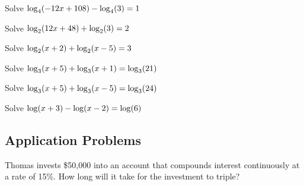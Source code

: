 \begin{exercise}
Solve $\displaystyle\log_4(-12x+108)-\log_4(3)=1$

\end{exercise}
\begin{solution}[4in]

\end{solution}

\begin{exercise}
Solve $\displaystyle\log_2(12x+48)+\log_2(3)=2$
\end{exercise}
\begin{solution}[4in]

\end{solution}

\begin{exercise}
Solve $\displaystyle\log_2(x+2)+\log_2(x-5)=3$
\end{exercise}
\begin{solution}[4.25in]

\end{solution}

\begin{exercise}
Solve $\displaystyle\log_3(x+5)+\log_3(x+1)=\log_3(21)$
\end{exercise}
\begin{solution}[4in]

\end{solution}

\begin{exercise}
Solve $\displaystyle\log_3(x+5)+\log_3(x-5)=\log_3(24)$
\end{exercise}
\begin{solution}[4.25in]

\end{solution}

\begin{exercise}
Solve $\displaystyle\log(x+3)-\log(x-2)=\log(6)$
\end{exercise}
\begin{solution}[3in]

\end{solution}

\subsection{Application Problems}

\begin{exercise}
Thomas invests \$50,000 into an account that compounds interest continuously
at a rate of 15\%. How long will it take for the investment to triple?
\end{exercise}
\begin{solution}[4.5in]

\end{solution}

